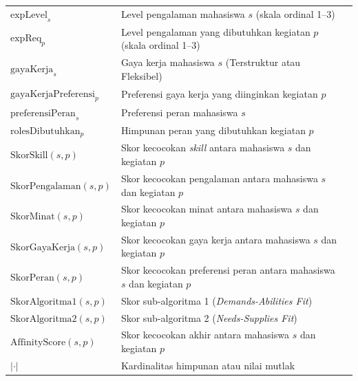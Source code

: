 \begin{longtable}{@{} l >{\raggedright\arraybackslash}p{7cm} c @{}}
$\text{expLevel}_s$              & Level pengalaman mahasiswa $s$ (skala ordinal 1--3)                           & \pageref{chap:perancangan} \\
$\text{expReq}_p$                & Level pengalaman yang dibutuhkan kegiatan $p$ (skala ordinal 1--3)            & \pageref{chap:perancangan} \\
$\text{gayaKerja}_s$             & Gaya kerja mahasiswa $s$ (Terstruktur atau Fleksibel)                         & \pageref{chap:perancangan} \\
$\text{gayaKerjaPreferensi}_p$   & Preferensi gaya kerja yang diinginkan kegiatan $p$                            & \pageref{chap:perancangan} \\
$\text{preferensiPeran}_s$       & Preferensi peran mahasiswa $s$                                                & \pageref{chap:perancangan} \\
$\text{rolesDibutuhkan}_p$       & Himpunan peran yang dibutuhkan kegiatan $p$                                   & \pageref{chap:perancangan} \\
$\text{SkorSkill}(s,p)$          & Skor kecocokan \emph{skill} antara mahasiswa $s$ dan kegiatan $p$             & \pageref{chap:perancangan} \\
$\text{SkorPengalaman}(s,p)$     & Skor kecocokan pengalaman antara mahasiswa $s$ dan kegiatan $p$               & \pageref{chap:perancangan} \\
$\text{SkorMinat}(s,p)$          & Skor kecocokan minat antara mahasiswa $s$ dan kegiatan $p$                    & \pageref{chap:perancangan} \\
$\text{SkorGayaKerja}(s,p)$      & Skor kecocokan gaya kerja antara mahasiswa $s$ dan kegiatan $p$               & \pageref{chap:perancangan} \\
$\text{SkorPeran}(s,p)$          & Skor kecocokan preferensi peran antara mahasiswa $s$ dan kegiatan $p$         & \pageref{chap:perancangan} \\
$\text{SkorAlgoritma1}(s,p)$     & Skor sub-algoritma 1 (\emph{Demands-Abilities Fit})                           & \pageref{chap:perancangan} \\
$\text{SkorAlgoritma2}(s,p)$     & Skor sub-algoritma 2 (\emph{Needs-Supplies Fit})                              & \pageref{chap:perancangan} \\
$\text{AffinityScore}(s,p)$      & Skor kecocokan akhir antara mahasiswa $s$ dan kegiatan $p$                    & \pageref{chap:perancangan} \\
$|\cdot|$                        & Kardinalitas himpunan atau nilai mutlak                                       & \pageref{chap:perancangan} \\

\end{longtable}
